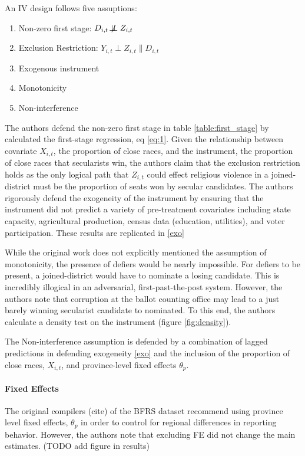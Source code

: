 \documentclass{scrartcl}
\begin{document}
An IV design follows five assuptions:

\begin{enumerate}
\item{Non-zero first stage: $D_{i,t} \not\!\perp\!\!\!\perp Z_{i,t}$}
\item{Exclusion Restriction: $Y_{i,t} \perp Z_{i,t} \| D_{i,t}$}
\item{Exogenous instrument}
\item{Monotonicity}
\item{Non-interference}
\end{enumerate}

The authors defend the non-zero first stage in table \ref{table:first_stage} by calculated the first-stage regression, eq \ref{eq:1}.
Given the relationship between covariate $X_{i,t}$, the proportion of close races, and the instrument, the proportion of close races that secularists win, the authors claim that the exclusion restriction holds as the only logical path that $Z_{i,t}$ could effect religious violence in a joined-district must be the proportion of seats won by secular candidates.
The authors rigorously defend the exogeneity of the instrument by ensuring that the instrument did not predict a variety of pre-treatment covariates including state capacity, agricultural production, census data (education, utilities), and voter participation. These results are replicated in \ref{exo}

While the original work does not explicitly mentioned the assumption of monotonicity, the presence of defiers would be nearly impossible.
For defiers to be present, a joined-district would have to nominate a losing candidate.
This is incredibly illogical in an adversarial, first-past-the-post system.
However, the authors note that corruption at the ballot counting office may lead to a just barely winning secularist candidate to nominated.
To this end, the authors calculate a density test on the instrument (figure \ref{fig:density}).

The Non-interference assumption is defended by a combination of lagged predictions in defending exogeneity \ref{exo} and the inclusion of the proportion of close races, $X_{i,t}$, and province-level fixed effects $\theta_p$.

\paragraph{Fixed Effects}
The original compilers (cite) of the BFRS dataset recommend using province level fixed effects, $\theta_p$ in order to control for regional differences in reporting behavior.
However, the authors note that excluding FE did not change the main estimates. (TODO add figure in results)
\end{document}
